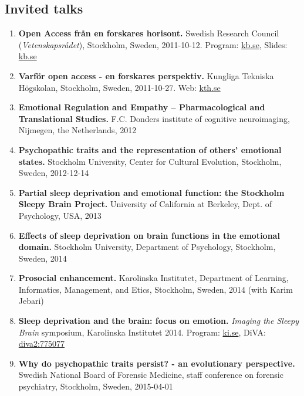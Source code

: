 \documentclass[10pt]{article}
\begin{document}
\subsection*{Invited talks}
\begin{enumerate}[nolistsep]
\item \textbf{Open Access från en forskares horisont.} Swedish Research Council (\emph{Vetenskapsrådet}), Stockholm, Sweden, 2011-10-12.
Program: \href{http://www.kb.se/Dokument/Bibliotek/utbildning/2011/Openaccesskrav_dialog12\%20okt\%20Uppdaterat.pdf}{kb.se}, 
Slides: \href{http://www.kb.se/dokument/Bibliotek/utbildning/2011/Nilsonne\%20Open\%20Access\%20forskares\%20horisont\%20111012.pdf}{kb.se}
\item \textbf{Varför open access - en forskares perspektiv.} Kungliga Tekniska Högskolan, Stockholm, Sweden, 2011-10-27.
Web: \href{https://www.kth.se/kthb/publicering/open-access/open-access-week/open-access-week-2011-1.546646}{kth.se}
\item \textbf{Emotional Regulation and Empathy – Pharmacological and Translational Studies.} F.C. Donders institute of cognitive neuroimaging, Nijmegen, the Netherlands, 2012
\item \textbf{Psychopathic traits and the representation of others’ emotional states.} Stockholm University, Center for Cultural Evolution, Stockholm, Sweden, 2012-12-14
\item \textbf{Partial sleep deprivation and emotional function: the Stockholm Sleepy Brain Project.} University of California at Berkeley, Dept. of Psychology, USA, 2013
\item \textbf{Effects of sleep deprivation on brain functions in the emotional domain.} Stockholm University, Department of Psychology, Stockholm, Sweden, 2014
\item \textbf{Prosocial enhancement.} Karolinska Institutet, Department of Learning, Informatics, Management, and Etics, Stockholm, Sweden, 2014 (with Karim Jebari)
\item \textbf{Sleep deprivation and the brain: focus on emotion.} \emph{Imaging the Sleepy Brain} symposium, Karolinska Institutet 2014.
Program: \href{http://ki.se/en/cns/calendar/imaging-the-sleepy-brain}{ki.se}, 
DiVA: \href{http://www.diva-portal.org/smash/record.jsf?pid=diva2\%3A775077\&dswid=-7532}{diva2:775077}
\item \textbf{Why do psychopathic traits persist? - an evolutionary perspective.} Swedish National Board of Forensic Medicine, staff conference on forensic psychiatry, Stockholm, Sweden, 2015-04-01

\end{enumerate}
\end{document}
